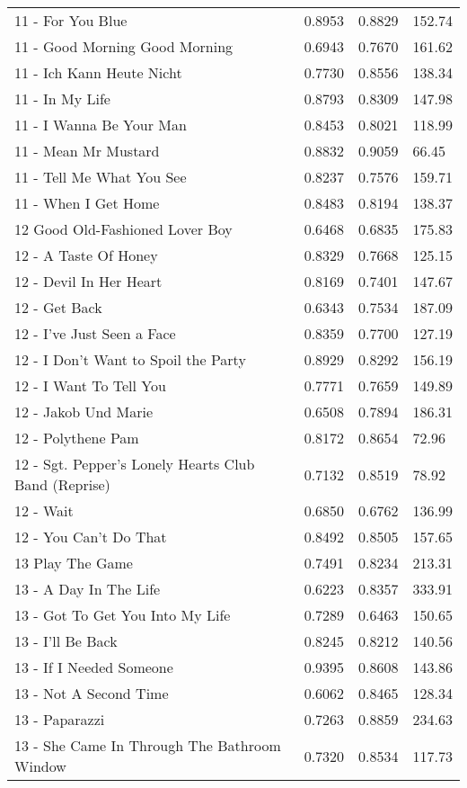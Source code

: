 \begin{longtable}[c]{|l|c|l|l|}
11 - For You Blue & 0.8953 & 0.8829 & 152.74 \\
11 - Good Morning Good Morning & 0.6943 & 0.7670 & 161.62 \\
11 - Ich Kann Heute Nicht & 0.7730 & 0.8556 & 138.34 \\
11 - In My Life & 0.8793 & 0.8309 & 147.98 \\
11 - I Wanna Be Your Man & 0.8453 & 0.8021 & 118.99 \\
11 - Mean Mr Mustard & 0.8832 & 0.9059 & 66.45 \\
11 - Tell Me What You See & 0.8237 & 0.7576 & 159.71 \\
11 - When I Get Home & 0.8483 & 0.8194 & 138.37 \\
12 Good Old-Fashioned Lover Boy & 0.6468 & 0.6835 & 175.83 \\
12 - A Taste Of Honey & 0.8329 & 0.7668 & 125.15 \\
12 - Devil In Her Heart & 0.8169 & 0.7401 & 147.67 \\
12 - Get Back & 0.6343 & 0.7534 & 187.09 \\
12 - I've Just Seen a Face & 0.8359 & 0.7700 & 127.19 \\
12 - I Don't Want to Spoil the Party & 0.8929 & 0.8292 & 156.19 \\
12 - I Want To Tell You & 0.7771 & 0.7659 & 149.89 \\
12 - Jakob Und Marie & 0.6508 & 0.7894 & 186.31 \\
12 - Polythene Pam & 0.8172 & 0.8654 & 72.96 \\
12 - Sgt. Pepper's Lonely Hearts Club Band (Reprise) & 0.7132 & 0.8519 & 78.92 \\
12 - Wait & 0.6850 & 0.6762 & 136.99 \\
12 - You Can't Do That & 0.8492 & 0.8505 & 157.65 \\
13 Play The Game & 0.7491 & 0.8234 & 213.31 \\
13 - A Day In The Life & 0.6223 & 0.8357 & 333.91 \\
13 - Got To Get You Into My Life & 0.7289 & 0.6463 & 150.65 \\
13 - I'll Be Back & 0.8245 & 0.8212 & 140.56 \\
13 - If I Needed Someone & 0.9395 & 0.8608 & 143.86 \\
13 - Not A Second Time & 0.6062 & 0.8465 & 128.34 \\
13 - Paparazzi & 0.7263 & 0.8859 & 234.63 \\
13 - She Came In Through The Bathroom Window & 0.7320 & 0.8534 & 117.73 \\

\end{longtable}
